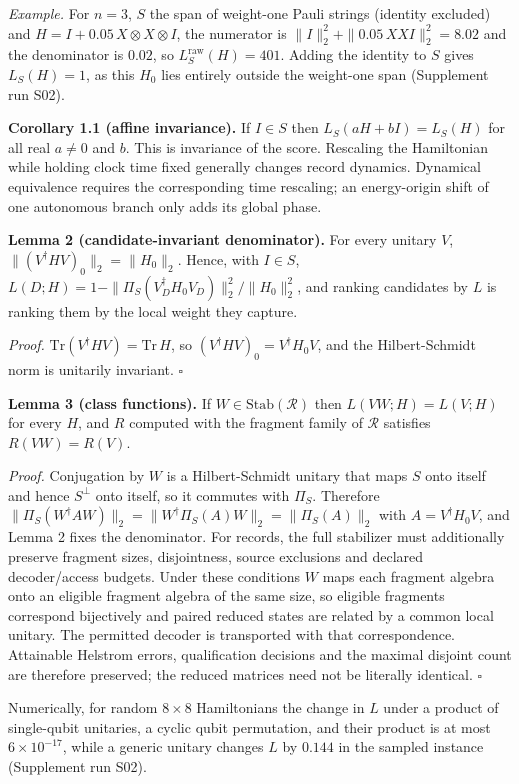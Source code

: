 \documentclass[
  10pt,
  a4paper,
]{article}
\begin{document}
\emph{Example.} For \(n=3\), \(S\) the span of weight-one Pauli strings
(identity excluded) and \(H=I+0.05\,X\otimes X\otimes I\), the numerator
is \(\|I\|_2^2+\|0.05\,XXI\|_2^2=8.02\) and the denominator is \(0.02\),
so \(L^{\mathrm{raw}}_S(H)=401\). Adding the identity to \(S\) gives
\(L_S(H)=1\), as this \(H_0\) lies entirely outside the weight-one span
(Supplement run S02).

\textbf{Corollary 1.1 (affine invariance).} If \(I\in S\) then
\(L_S(aH+bI)=L_S(H)\) for all real \(a\ne0\) and \(b\). This is
invariance of the score. Rescaling the Hamiltonian while holding clock
time fixed generally changes record dynamics. Dynamical equivalence
requires the corresponding time rescaling; an energy-origin shift of one
autonomous branch only adds its global phase.

\textbf{Lemma 2 (candidate-invariant denominator).} For every unitary
\(V\), \(\|(V^\dagger HV)_0\|_2=\|H_0\|_2\). Hence, with \(I\in S\),
\(L(D;H)=1-\|\Pi_S(V_D^\dagger H_0V_D)\|_2^2/\|H_0\|_2^2\), and ranking
candidates by \(L\) is ranking them by the local weight they capture.

\emph{Proof.} \(\mathrm{Tr}(V^\dagger HV)=\mathrm{Tr}\,H\), so
\((V^\dagger HV)_0=V^\dagger H_0V\), and the Hilbert-Schmidt norm is
unitarily invariant. \(\square\)

\textbf{Lemma 3 (class functions).} If \(W\in\mathrm{Stab}(\mathcal R)\)
then \(L(VW;H)=L(V;H)\) for every \(H\), and \(R\) computed with the
fragment family of \(\mathcal R\) satisfies \(R(VW)=R(V)\).

\emph{Proof.} Conjugation by \(W\) is a Hilbert-Schmidt unitary that
maps \(S\) onto itself and hence \(S^\perp\) onto itself, so it commutes
with \(\Pi_S\). Therefore
\(\|\Pi_S(W^\dagger AW)\|_2=\|W^\dagger\Pi_S(A)W\|_2=\|\Pi_S(A)\|_2\)
with \(A=V^\dagger H_0V\), and Lemma 2 fixes the denominator. For
records, the full stabilizer must additionally preserve fragment sizes,
disjointness, source exclusions and declared decoder/access budgets.
Under these conditions \(W\) maps each fragment algebra onto an eligible
fragment algebra of the same size, so eligible fragments correspond
bijectively and paired reduced states are related by a common local
unitary. The permitted decoder is transported with that correspondence.
Attainable Helstrom errors, qualification decisions and the maximal
disjoint count are therefore preserved; the reduced matrices need not be
literally identical. \(\square\)

Numerically, for random \(8\times8\) Hamiltonians the change in \(L\)
under a product of single-qubit unitaries, a cyclic qubit permutation,
and their product is at most \(6\times10^{-17}\), while a generic
unitary changes \(L\) by \(0.144\) in the sampled instance (Supplement
run S02).
\end{document}

